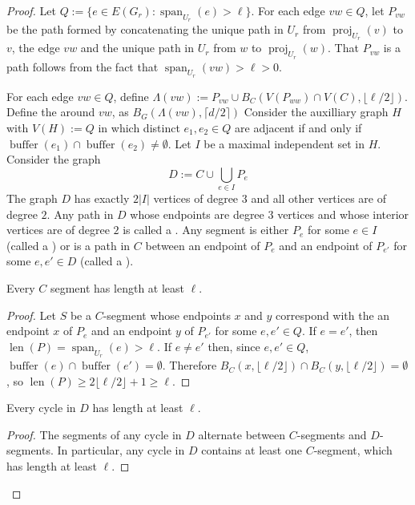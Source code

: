 \documentclass{patmorin}
\DeclareMathOperator{\len}{len}
\DeclareMathOperator{\buffer}{buffer}
\DeclareMathOperator{\proj}{proj}
\DeclareMathOperator{\spn}{span}
\begin{document}
\begin{proof}
  Let $Q:=\{e\in E(G_r):\spn_{U_r}(e)>\ell\}$.  For each edge $vw\in Q$, let $P_{vw}$ be the path formed by concatenating the unique path in $U_r$ from $\proj_{U_r}(v)$ to $v$, the edge $vw$ and the unique path in $U_r$ from $w$ to $\proj_{U_r}(w)$.  That $P_{vw}$ is a path follows from the fact that $\spn_{U_r}(vw)>\ell>0$.

  For each edge $vw\in Q$, define $\Lambda(vw):=P_{vw}\cup B_C(V(P_{ww})\cap V(C),\lfloor\ell/2\rfloor)$.  Define the  around $vw$, as $B_G(\Lambda(vw),\lceil d/2\rceil)$
  Consider the auxilliary graph $H$ with $V(H):=Q$ in which distinct $e_1,e_2\in Q$ are adjacent if and only if $\buffer(e_1)\cap\buffer(e_2)\neq\emptyset$. Let $I$ be a maximal independent set in $H$.  Consider the graph
  \[
    D:=C\cup \bigcup_{e\in I} P_e
  \]
  The graph $D$ has exactly $2|I|$ vertices of degree $3$ and all other vertices are of degree $2$.  Any path in $D$ whose endpoints are degree $3$ vertices and whose interior vertices are of degree $2$ is called a .  Any segment is either $P_e$ for some $e\in I$ (called a ) or is a path in $C$ between an endpoint of $P_e$ and an endpoint of $P_{e'}$ for some $e,e'\in D$ (called a ).

  \begin{clm}\label{c_segments_are_long}
    Every $C$ segment has length at least $\ell$.
  \end{clm}

  \begin{proof}
    Let $S$ be a $C$-segment whose endpoints $x$ and $y$ correspond with the an endpoint $x$ of $P_e$ and an endpoint $y$ of $P_{e'}$ for some $e,e'\in Q$. If $e=e'$, then $\len(P)=\spn_{U_r}(e)>\ell$.  If $e\neq e'$ then, since $e,e'\in Q$,  $\buffer(e)\cap\buffer(e')=\emptyset$.  Therefore $B_C(x,\lfloor\ell/2\rfloor)\cap B_C(y,\lfloor\ell/2\rfloor)=\emptyset$, so $\len(P)\ge 2\lfloor\ell/2\rfloor+1\ge\ell$.
  \end{proof}

  \begin{clm}\label{cycles_are_long}
    Every cycle in $D$ has length at least $\ell$.
  \end{clm}
  \begin{proof}
    The segments of any cycle in $D$ alternate between $C$-segments and $D$-segments. In particular, any cycle in $D$ contains at least one $C$-segment, which has length at least $\ell$.
  \end{proof}


\end{proof}
\end{document}

